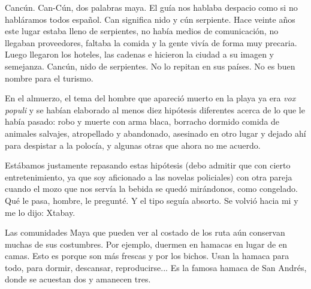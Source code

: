 \documentclass[11pt,twoside,openright,a6paper]{book}
\begin{document}
\vspace{0.5cm}
\hrulefill\hspace{0.2cm} \decofourleft\decofourright \hspace{0.2cm} \hrulefill
\vspace{0.5cm}

 Cancún. Can-Cún, dos palabras maya. El guía nos
hablaba despacio como si no habláramos todos español. Can significa nido
y cún serpiente. Hace veinte años este lugar estaba lleno de serpientes,
no había medios de comunicación, no llegaban proveedores, faltaba la
comida y la gente vivía de forma muy precaria. Luego llegaron los hoteles,
las cadenas e hicieron la ciudad a su imagen y semejanza. Cancún, nido de
serpientes. No lo repitan en sus países. No es buen nombre para el turismo.


\vspace{0.5cm}
\hrulefill\hspace{0.2cm} \decofourleft\decofourright \hspace{0.2cm} \hrulefill
\vspace{0.5cm}

En el almuerzo, el tema del hombre que apareció muerto en la playa ya era
\emph{vox populi} y se habían elaborado al menos diez hipótesis diferentes
acerca de lo que le había pasado: robo y muerte con arma blaca, borracho
dormido comida de animales salvajes, atropellado y abandonado, asesinado
en otro lugar y dejado ahí para despistar a la polocía, y algunas otras
que ahora no me acuerdo.

Estábamos justamente repasando estas hipótesis (debo admitir que con cierto
entretenimiento, ya que soy aficionado a las novelas policiales) con otra
pareja cuando el mozo que nos servía la bebida se quedó mirándonos,
como congelado. Qué le pasa, hombre, le pregunté. Y el tipo seguía
absorto. Se volvió hacia mi y me lo dijo: Xtabay.


\vspace{0.5cm}
\hrulefill\hspace{0.2cm} \decofourleft\decofourright \hspace{0.2cm} \hrulefill
\vspace{0.5cm}

Las comunidades Maya que pueden ver al costado de los ruta aún conservan
muchas de sus costumbres. Por ejemplo, duermen en hamacas en lugar de en
camas. Esto es porque son más frescas y por los bichos. Usan la hamaca
para todo, para dormir, descansar, reproducirse... Es la famosa hamaca de
San Andrés, donde se acuestan dos y amanecen tres.
\end{document}
